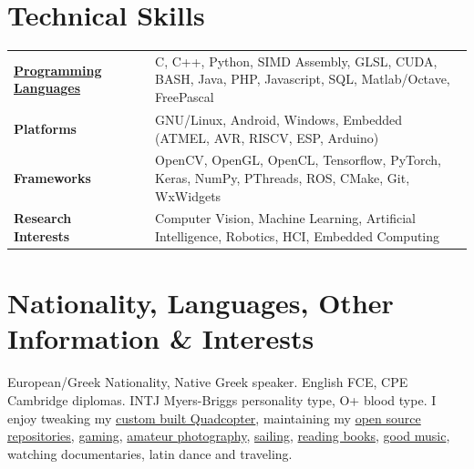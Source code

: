 \documentclass[a4,8pt]{article}
\newcommand{\hskills}[1]{
\textbf{\bfseries #1} }
\begin{document}
\section{Technical Skills}
\linespread{0.6} 
\begin{tabular}{p{11em} p{1em} p{43em}}
\hskills{\href{https://www.openhub.net/accounts/AmmarkoV/languages}{Programming Languages} }&  &  C, C++, Python, SIMD Assembly, GLSL, CUDA, BASH, Java, PHP, Javascript, SQL, Matlab/Octave, FreePascal \\
\hskills{Platforms} &  & GNU/Linux, Android, Windows, Embedded (ATMEL, AVR, RISCV, ESP, Arduino)   \\
\hskills{Frameworks} &  & OpenCV, OpenGL, OpenCL, Tensorflow, PyTorch, Keras, NumPy, PThreads, ROS, CMake, Git, WxWidgets \\
\hskills{Research Interests} &  &Computer Vision, Machine Learning, Artificial Intelligence, Robotics, HCI, Embedded Computing \\
\end{tabular}
\vspace{-0.2cm}
\linespread{0.82} 
\section{Nationality, Languages, Other Information \& Interests}
\linespread{0.6} 
\vspace{-0.2cm} 
European/Greek Nationality, Native Greek speaker. English FCE, CPE Cambridge diplomas. INTJ Myers-Briggs personality type, O+ blood type. I enjoy tweaking my \href{https://github.com/AmmarkoV/OpenDroneA/tree/master/ammarforce}{custom built Quadcopter}, maintaining my \href{https://github.com/AmmarkoV/}{open source repositories},  \href{https://steamcommunity.com/id/ammarkov/badges}{gaming}, \href{https://www.deviantart.com/ammarkov1}{amateur photography}, \href{https://www.youtube.com/watch?v=ituN8OGYGbc}{sailing}, \href{https://www.facebook.com/photo/?fbid=10160115991268040&set=a.455008078039}{reading books}, \href{https://open.spotify.com/user/312mcszdrjonbv4wgzzd5ndcmsim?si=dd06aeb4af604bdd}{good music}, watching documentaries, latin dance and traveling.

\linespread{0.82} 
\end{document}
